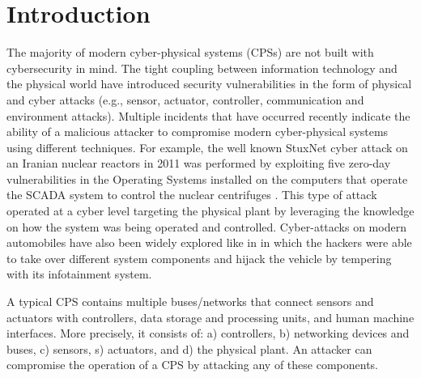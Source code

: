 \documentclass[letterpaper, 10 pt, conference]{ieeeconf}  %
\newcommand\NB[1]{$\spadesuit$\footnote{NB: #1}}
\begin{document}
\section{Introduction}
The majority of modern cyber-physical systems (CPSs) are not built with cybersecurity in mind. The tight coupling between information technology and the physical world have introduced security vulnerabilities in the form of physical and cyber attacks (e.g., sensor, actuator, controller, communication and environment attacks).
Multiple incidents that have occurred recently indicate the ability of a malicious attacker to compromise modern cyber-physical systems using different techniques. For example, the well known StuxNet cyber attack on an Iranian nuclear reactors in 2011 was performed by exploiting five zero-day vulnerabilities in the Operating Systems installed on the computers that operate the SCADA system to control the nuclear centrifuges \cite{langner_2013}. This type of attack operated at a cyber level targeting the physical plant by leveraging the knowledge on how the system was being operated and controlled. Cyber-attacks on modern automobiles have also been widely explored like in \cite{} in which the hackers were able to take over different  system components and hijack the vehicle by tempering with its infotainment system.

A typical CPS contains multiple buses/networks that connect sensors and actuators with controllers, data storage and processing units, and human machine interfaces. More precisely, it consists of: a) controllers, b) networking devices and buses, c) sensors, s) actuators, and d) the physical plant. An attacker can compromise the operation of a CPS by attacking any of these components. 
\end{document}
